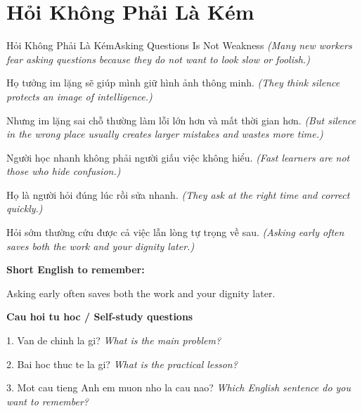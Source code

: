 \section{Hỏi Không Phải Là Kém}
\begin{truyen}{Hỏi Không Phải Là Kém}{Asking Questions Is Not Weakness}
\textit{(Many new workers fear asking questions because they do not want to look slow or foolish.)}

Họ tưởng im lặng sẽ giúp mình giữ hình ảnh thông minh.
\textit{(They think silence protects an image of intelligence.)}

Nhưng im lặng sai chỗ thường làm lỗi lớn hơn và mất thời gian hơn.
\textit{(But silence in the wrong place usually creates larger mistakes and wastes more time.)}

Người học nhanh không phải người giấu việc không hiểu.
\textit{(Fast learners are not those who hide confusion.)}

Họ là người hỏi đúng lúc rồi sửa nhanh.
\textit{(They ask at the right time and correct quickly.)}

\end{truyen}

\begin{baihoc}
Hỏi sớm thường cứu được cả việc lẫn lòng tự trọng về sau.
\textit{(Asking early often saves both the work and your dignity later.)}
\end{baihoc}

\begin{ghinhoanh}
\textbf{Short English to remember:}

Asking early often saves both the work and your dignity later.

\end{ghinhoanh}

\begin{tuhocnhanh}
\textbf{Cau hoi tu hoc / Self-study questions}

1. Van de chinh la gi? \textit{What is the main problem?}

2. Bai hoc thuc te la gi? \textit{What is the practical lesson?}

3. Mot cau tieng Anh em muon nho la cau nao? \textit{Which English sentence do you want to remember?}
\end{tuhocnhanh}
\ngancach

